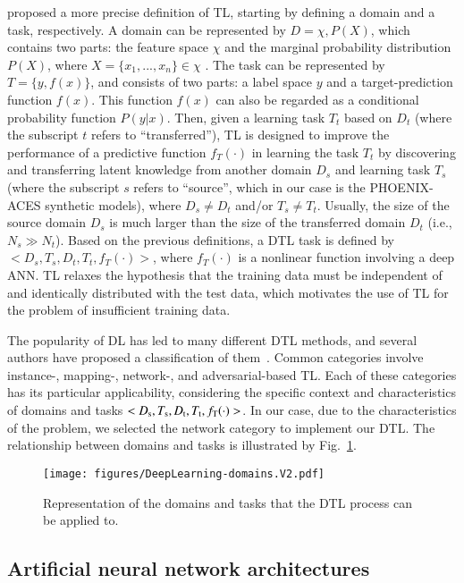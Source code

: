 \documentclass{aa}
\begin{document}
\citet{5288526} proposed a more precise definition of TL, starting by defining a domain and a task, respectively. A domain can be represented by $ D = {\chi, P (X)} $, which contains two parts: the feature space $\chi$ and the marginal probability distribution $ P (X)$, where $ X = \{x_1, ..., x_n\} \in \chi $ . The task can be represented by $ T = \{y, f (x)\} $, and consists of two parts: a label space $ y $ and a target-prediction function $f(x)$. This function $ f (x) $ can also be regarded as a conditional probability function $P(y|x)$. Then, given a learning task $T_t$ based on $D_t$ (where the subscript $t$ refers to ``transferred''), TL is designed to improve the performance of a predictive function $f_T(\cdot)$ in learning the task $T_t$ by discovering and transferring latent knowledge from another domain $D_s$ and learning task $T_s$ (where the subscript $s$ refers to ``source'', which in our case is the PHOENIX-ACES synthetic models), where $D_s \neq D_t$ and/or $T_s \neq T_t$. Usually, the size of the source domain $D_s$ is much larger than the size of the transferred domain $D_t$ (i.e., $N_s \gg N_t$). Based on the previous definitions, a DTL task is defined by $<D_s,T_s,D_t,T_t,f_T(\cdot)>$, where $f_T(\cdot)$ is a nonlinear function involving a deep ANN. TL relaxes the hypothesis that the training data must be independent of and identically distributed with the test data, which motivates the use of TL for the problem of insufficient training data.

The popularity of DL has led to many different DTL methods, and several authors have proposed a classification of them~\citep{10.1007/978-3-030-01424-7_27,zhao2021applications}. Common categories involve instance-, mapping-, network-, and adversarial-based TL. Each of these categories has its particular applicability, considering the specific context and characteristics of domains and tasks $<D_{\rm s},T_{\rm s},D_{\rm t},T_{\rm t},f_{\rm T}(\cdot)>$. In our case, due to the characteristics of the problem, we selected the network category to implement our DTL.
The relationship between domains and tasks is illustrated by Fig.~\ref{fig:domains}.

\begin{figure}
  \centering
  \texttt{[image: figures/DeepLearning-domains.V2.pdf]}  
  \caption{Representation of the domains and tasks that the DTL process can be applied to.}
  \label{fig:domains}
\end{figure}


\subsection{Artificial neural network architectures}
\end{document}
